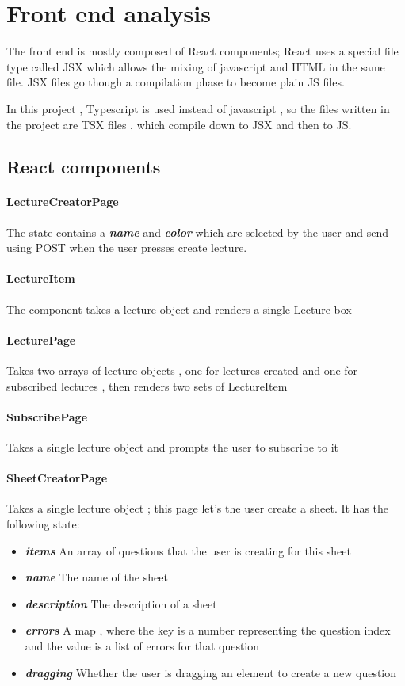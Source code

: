 \section{Front end analysis}
The front end is mostly composed of React components; React uses a special file type called JSX which allows the mixing of javascript and HTML in the same file. JSX files go though a compilation phase to become plain JS files.

In this project , Typescript is used instead of javascript , so the files written in the project are TSX files , which compile down to JSX and then to JS.

\subsection{React components}
\paragraph{LectureCreatorPage} The state contains a \textit{\textbf{name}} and \textit{\textbf{color}} which are selected by the user and send using POST when the user presses create lecture.
\paragraph{LectureItem} The component takes a lecture object and renders a single Lecture box
\paragraph{LecturePage} Takes two arrays of lecture objects , one for lectures created and one for subscribed lectures , then renders two sets of LectureItem
\paragraph{SubscribePage} Takes a single lecture object and prompts the user to subscribe to it
\paragraph{SheetCreatorPage} Takes a single lecture object ; this page let's the user create a sheet. It has the following state:
\begin{itemize}
	\item \textit{\textbf{items}} An array of questions that the user is creating for this sheet
	\item \textit{\textbf{name}} The name of the sheet
	\item \textit{\textbf{description}} The description of a sheet
	\item \textit{\textbf{errors}} A map , where the key is a number representing the question index and the value is a list of errors for that question
	\item \textit{\textbf{dragging}} Whether the user is dragging an element to create a new question
\end{itemize}
